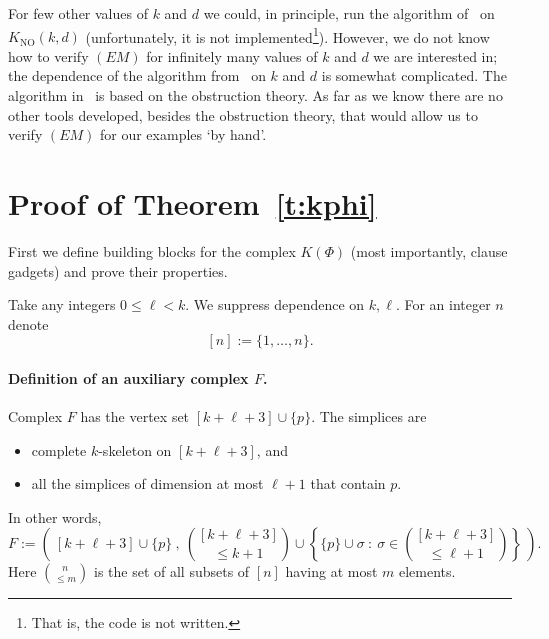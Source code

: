 \documentclass[runningheads]{llncs}
\theoremstyle{remark}
\theoremstyle{definition}
\DeclareMathOperator\NO{NO}
\def\Kn{K_{\NO}}
\begin{document}
{For few other values of $k$ and $d$ we could, in principle, run the algorithm
of~\cite{CKV} on $\Kn(k,d)$ (unfortunately, it is not implemented\footnote{That
is, the code is not written.}).
However, we do not know how to verify $(EM)$ for infinitely many values of $k$ and $d$ we
are interested in; the dependence of the algorithm from~\cite{CKV} on $k$ and
$d$ is somewhat complicated. The algorithm in~\cite{CKV} is based on
the obstruction theory. As far as we know there are no other tools developed,
besides the obstruction theory, that would allow us to verify $(EM)$ for our
examples `by hand'.




\section{Proof of Theorem~\ref{t:kphi}}\label{s:pr}

First we define building blocks for the complex $K(\Phi)$ (most importantly, clause gadgets) and prove their properties.

Take any integers $0\le \ell<k$.
We suppress dependence on $k, \ell$.
For an integer $n$ denote
$$[n]:=\{1, \ldots, n\}.$$

\paragraph{Definition of an auxiliary complex $F$.}
Complex $F$ has the vertex set
\linebreak
$[k +\ell + 3]\cup\{p\}$.
The simplices are
\begin{itemize}
\item complete $k$-skeleton on $[k +\ell + 3]$, and
\item all the simplices of dimension at most $\ell + 1$ that contain $p$.
\end{itemize}
In other words,
$$F := \left(\ [k +\ell + 3]\cup \{p\}\ ,
\ {[k +\ell+3]\choose\le k+1}\cup\left\{\{p\}\cup\sigma\ :\ \sigma\in{[k +\ell+3]\choose\le\ell+1}\right\}\ \right).$$
Here ${n\choose \le m}$ is the set of all subsets of $[n]$ having at most $m$ elements.

}
\end{document}
